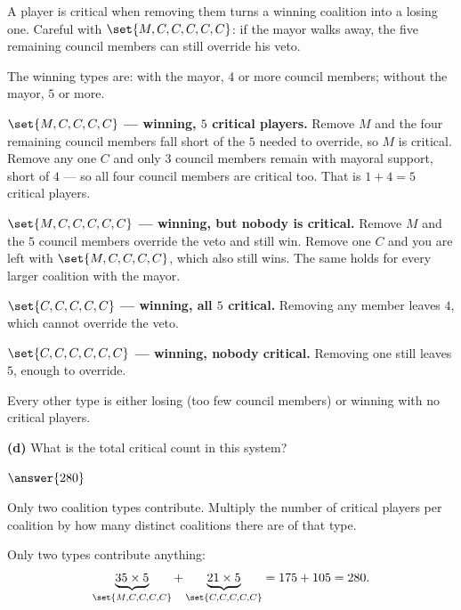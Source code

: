 \documentclass[12pt]{ximera}
\begin{document}
\begin{problem}
\begin{prompt}
\begin{hint}
A player is critical when removing them turns a winning coalition into a losing one.
Careful with $\set{M,C,C,C,C,C}$: if the mayor walks away, the five remaining council
members can still override his veto.
\end{hint}

\begin{feedback}
The winning types are: with the mayor, $4$ or more council members; without the mayor,
$5$ or more.

\textbf{$\set{M,C,C,C,C}$ --- winning, $5$ critical players.} Remove $M$ and the four
remaining council members fall short of the $5$ needed to override, so $M$ is
critical. Remove any one $C$ and only $3$ council members remain with mayoral support,
short of $4$ --- so all four council members are critical too. That is $1+4 = 5$
critical players.

\textbf{$\set{M,C,C,C,C,C}$ --- winning, but nobody is critical.} Remove $M$ and the
$5$ council members override the veto and still win. Remove one $C$ and you are left
with $\set{M,C,C,C,C}$, which also still wins. The same holds for every larger
coalition with the mayor.

\textbf{$\set{C,C,C,C,C}$ --- winning, all $5$ critical.} Removing any member leaves
$4$, which cannot override the veto.

\textbf{$\set{C,C,C,C,C,C}$ --- winning, nobody critical.} Removing one still leaves
$5$, enough to override.

Every other type is either losing (too few council members) or winning with no
critical players.
\end{feedback}
\end{prompt}

\begin{prompt}
\textbf{(d)} What is the total critical count in this system?

$\answer{280}$

\begin{hint}
Only two coalition types contribute. Multiply the number of critical players per
coalition by how many distinct coalitions there are of that type.
\end{hint}

\begin{feedback}
Only two types contribute anything:
\[
\underbrace{35 \times 5}_{\set{M,C,C,C,C}} + \underbrace{21 \times 5}_{\set{C,C,C,C,C}}
= 175 + 105 = 280.
\]
\end{feedback}
\end{prompt}


\end{problem}
\end{document}
